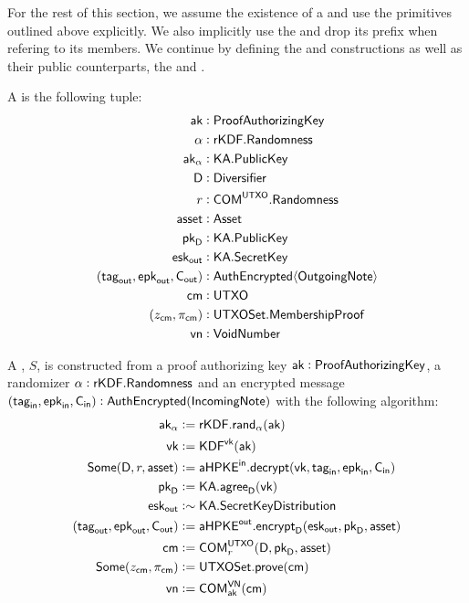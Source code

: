 For the rest of this section, we assume the existence of a \TransferConfiguration{} and use the primitives outlined above explicitly. We also implicitly use the \KeySchedule{} and drop its prefix when refering to its members. We continue by defining the \Sender{} and \Receiver{} constructions as well as their public counterparts, the \SenderPost{} and \ReceiverPost{}.

\begin{definition}
    A \Sender{} is the following tuple:
    \begin{align*}
        \ak                       &: \ProofAuthorizingKey \\
        \alpha                    &: \rKDF.\Randomness \\
        \ak_\alpha                &: \KA.\PublicKey \\
        \textsf{D}                &: \Diversifier \\
        r                         &: \COM^\UTXO.\Randomness \\
        \asset                    &: \Asset \\
        \pkD                      &: \KA.\PublicKey \\
        \eskout                   &: \KA.\SecretKey \\
        (\tagout, \epkout, \Cout) &: \AuthEncrypted\bra{\OutgoingNote} \\
        \cm                       &: \UTXO \\
        (z_\cm, \pi_\cm)          &: \UTXOSet.\MembershipProof \\
        \vn                       &: \VoidNumber
    \end{align*}

    A \Sender{}, $S$, is constructed from a proof authorizing key $\ak : \ProofAuthorizingKey$, a randomizer $\alpha : \rKDF.\Randomness$ and an encrypted message $(\tagin, \epkin, \Cin) : \AuthEncrypted(\IncomingNote)$ with the following algorithm:
    \begin{align*}
        \ak_\alpha                   &:= \rKDF.\rand_\alpha(\ak) \\
        \vk                          &:= \KDF^\vk(\ak) \\
        \Some(\textsf{D}, r, \asset) &:= \aHPKEin.\decrypt(\vk, \tagin, \epkin, \Cin) \\
        \pkD                         &:= \KA.\agree_\textsf{D}(\vk) \\
        \eskout                      &:\sim \KA.\SecretKeyDistribution \\
        (\tagout, \epkout, \Cout)    &:= \aHPKEout.\encrypt_\textsf{D}(\eskout, \pkD, \asset) \\
        \cm                          &:= \COM^{\UTXO}_{r}(\textsf{D}, \pkD, \asset) \\
        \Some(z_\cm, \pi_\cm)        &:= \UTXOSet.\prove(\cm) \\
        \vn                          &:= \COM^{\VN}_\ak(\cm)
    \end{align*}


\end{definition}

